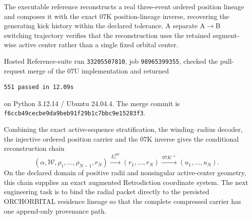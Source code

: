The executable reference reconstructs a real three-event ordered position lineage and composes it with the exact 07K position-lineage inverse, recovering the generating kick history within the declared tolerance. A separate A$\to$B switching trajectory verifies that the reconstruction uses the retained segment-wise active center rather than a single fixed orbital center.

Hosted Reference-suite run \texttt{33205507810}, job \texttt{98965399355}, checked the pull-request merge of the 07U implementation and returned
\begin{verbatim}
551 passed in 12.09s
\end{verbatim}
on Python 3.12.14 / Ubuntu 24.04.4. The merge commit is \texttt{f6ccb49cecbe9da9beb91f29b1c7bbc9e15283f3}.

Combining the exact active-sequence stratification, the winding--radius decoder, the injective ordered position carrier and the 07K inverse gives the conditional reconstruction chain
\[
\boxed{
(\alpha,\mathcal W,\rho_1,\ldots,\rho_{N-1},r_N)
\xrightarrow{\ L_s^{\rho W}\ }
(r_1,\ldots,r_N)
\xrightarrow{\ 07K^{-1}\ }
(u_1,\ldots,u_N).
}
\]
On the declared domain of positive radii and nonsingular active-center geometry, this chain supplies an exact augmented Retrodiction coordinate system. The next engineering task is to bind the radial packet directly to the persisted ORCHORBITAL residence lineage so that the complete compressed carrier has one append-only provenance path.
